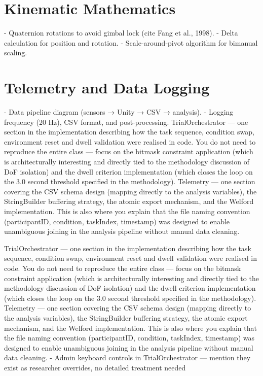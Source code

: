 \section{Kinematic Mathematics}
\label{}
- Quaternion rotations to avoid gimbal lock (cite Fang et al., 1998).
- Delta calculation for position and rotation.
- Scale‑around‑pivot algorithm for bimanual scaling.

\section{Telemetry and Data Logging}
\label{}
- Data pipeline diagram (sensors → Unity → CSV → analysis).
- Logging frequency (20 Hz), CSV format, and post‑processing.
TrialOrchestrator — one section in the implementation describing how the task sequence, condition swap, environment reset and dwell validation were realised in code. You do not need to reproduce the entire class — focus on the bitmask constraint application (which is architecturally interesting and directly tied to the methodology discussion of DoF isolation) and the dwell criterion implementation (which closes the loop on the 3.0 second threshold specified in the methodology).
Telemetry — one section covering the CSV schema design (mapping directly to the analysis variables), the StringBuilder buffering strategy, the atomic export mechanism, and the Welford implementation. This is also where you explain that the file naming convention (participantID, condition, taskIndex, timestamp) was designed to enable unambiguous joining in the analysis pipeline without manual data cleaning.

TrialOrchestrator — one section in the implementation describing how the task sequence, condition swap, environment reset and dwell validation were realised in code. You do not need to reproduce the entire class — focus on the bitmask constraint application (which is architecturally interesting and directly tied to the methodology discussion of DoF isolation) and the dwell criterion implementation (which closes the loop on the 3.0 second threshold specified in the methodology).
Telemetry — one section covering the CSV schema design (mapping directly to the analysis variables), the StringBuilder buffering strategy, the atomic export mechanism, and the Welford implementation. This is also where you explain that the file naming convention (participantID, condition, taskIndex, timestamp) was designed to enable unambiguous joining in the analysis pipeline without manual data cleaning.
- Admin keyboard controls in TrialOrchestrator — mention they exist as researcher overrides, no detailed treatment needed

